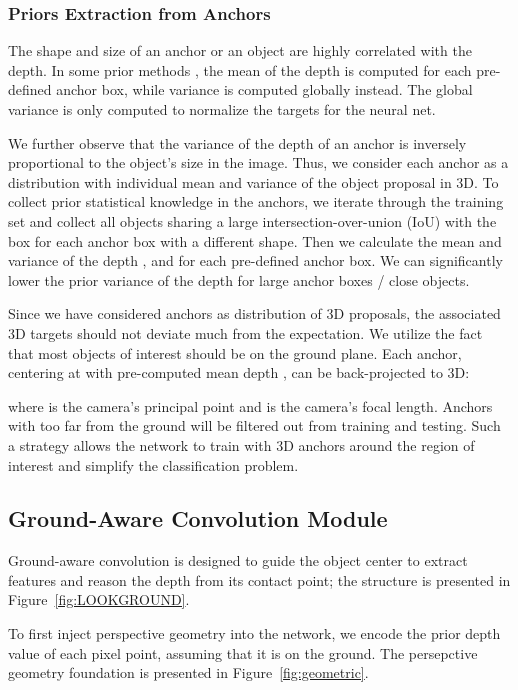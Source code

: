 \documentclass[letterpaper, 10 pt, journal, twoside]{IEEEtran}
\begin{document}
\subsubsection{Priors Extraction from Anchors}
The shape and size of an anchor or an object are highly correlated with the depth. In some prior methods \cite{Brazil2019M3DRPN}, the mean of the depth is computed for each pre-defined anchor box, while variance is computed globally instead. The global variance is only computed to normalize the targets for the neural net.

We further observe that the variance of the depth  of an anchor is inversely proportional to the object's size in the image. Thus, we consider each anchor as a distribution with individual mean and variance of the object proposal in 3D. To collect prior statistical knowledge in the anchors, we iterate through the training set and collect all objects sharing a large intersection-over-union (IoU) with the box for each anchor box with a different shape.
Then we calculate the mean and variance of the depth ,  and  for each pre-defined anchor box. 
We can significantly lower the prior variance of the depth  for large anchor boxes / close objects.

Since we have considered anchors as distribution of 3D proposals, the associated 3D targets should not deviate much from the expectation. We utilize the fact that most objects of interest should be on the ground plane. Each anchor, centering at  with pre-computed mean depth , can be back-projected to 3D:

where  is the camera's principal point and  is the camera's focal length. Anchors with  too far from the ground will be filtered out from training and testing. Such a strategy allows the network to train with 3D anchors around the region of interest and simplify the classification problem.

\subsection{Ground-Aware Convolution Module}
\label{sec:lookground}
Ground-aware convolution is designed to guide the object center to extract features and reason the depth from its contact point; the structure is presented in Figure~\ref{fig:LOOKGROUND}.


To first inject perspective geometry into the network, we encode the prior depth value  of each pixel point, assuming that it is on the ground. The persepctive geometry foundation is presented in Figure~\ref{fig:geometric}.
\end{document}
